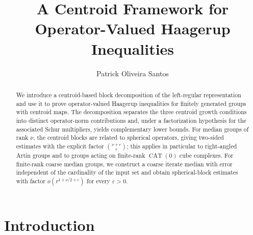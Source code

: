 \documentclass[12pt,reqno]{amsart}
\title[Operator-Valued Haagerup Inequalities]{A Centroid Framework for Operator-Valued Haagerup Inequalities}
\author[P.\ O.\ Santos]{Patrick Oliveira Santos}
\numberwithin{equation}{section}
\begin{document}
\begin{abstract}
We introduce a centroid-based block decomposition of the left-regular representation and use it to prove operator-valued Haagerup inequalities for finitely generated groups with centroid maps. The decomposition separates the three centroid growth conditions into distinct operator-norm contributions and, under a factorization hypothesis for the associated Schur multipliers, yields complementary lower bounds. For median groups of rank $\nu$, the centroid blocks are related to spherical operators, giving two-sided estimates with the explicit factor $\binom{\nu+r}{r}$; this applies in particular to right-angled Artin groups and to groups acting on finite-rank $\operatorname{CAT}(0)$ cube complexes. For finite-rank coarse median groups, we construct a coarse iterate median with error independent of the cardinality of the input set and obtain spherical-block estimates with factor $o(r^{1+\nu/2+\varepsilon})$ for every $\varepsilon>0$.
\end{abstract}

\maketitle

\newtheorem{theorem}{Theorem}[section]
\theoremstyle{plain}



\newtheorem{corollary}[theorem]{Corollary}
\newtheorem{lemma}[theorem]{Lemma}
\newtheorem{conjecture}[theorem]{Conjecture}
\newtheorem{proposition}[theorem]{Proposition}

\theoremstyle{definition}
\newtheorem{example}[theorem]{Example}
\newtheorem{definition}[theorem]{Definition}
\newtheorem{remark}[theorem]{Remark}
\newtheorem{question}[theorem]{Question}



\section{Introduction}\label{section: introduction}
\end{document}
